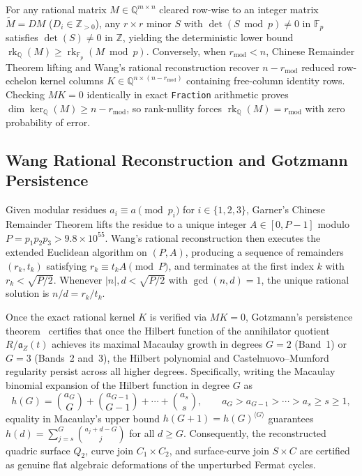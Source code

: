 \documentclass[11pt,a4paper]{article}
\begin{document}
For any rational matrix $M \in \mathbb{Q}^{m \times n}$ cleared row-wise to an integer matrix $\widetilde{M} = D M$ ($D_i \in \mathbb{Z}_{>0}$), any $r \times r$ minor $S$ with $\det(S \bmod p) \neq 0$ in $\mathbb{F}_p$ satisfies $\det(S) \neq 0$ in $\mathbb{Z}$, yielding the deterministic lower bound $\operatorname{rk}_{\mathbb{Q}}(M) \ge \operatorname{rk}_{\mathbb{F}_p}(M \bmod p)$. Conversely, when $r_{\mathrm{mod}} < n$, Chinese Remainder Theorem lifting and Wang's rational reconstruction recover $n - r_{\mathrm{mod}}$ reduced row-echelon kernel columns $K \in \mathbb{Q}^{n \times (n - r_{\mathrm{mod}})}$ containing free-column identity rows. Checking $M K = 0$ identically in exact \texttt{Fraction} arithmetic proves $\dim \ker_{\mathbb{Q}}(M) \ge n - r_{\mathrm{mod}}$, so rank-nullity forces $\operatorname{rk}_{\mathbb{Q}}(M) = r_{\mathrm{mod}}$ with zero probability of error.

\subsection{Wang Rational Reconstruction and Gotzmann Persistence}
Given modular residues $a_i \equiv a \pmod{p_i}$ for $i \in \{1, 2, 3\}$, Garner's Chinese Remainder Theorem lifts the residue to a unique integer $A \in [0, P - 1]$ modulo $P = p_1 p_2 p_3 > 9.8 \times 10^{55}$. Wang's rational reconstruction then executes the extended Euclidean algorithm on $(P, A)$, producing a sequence of remainders $(r_k, t_k)$ satisfying $r_k \equiv t_k A \pmod{P}$, and terminates at the first index $k$ with $r_k < \sqrt{P/2}$. Whenever $|n|, d < \sqrt{P/2}$ with $\gcd(n, d) = 1$, the unique rational solution is $n/d = r_k / t_k$.

Once the exact rational kernel $K$ is verified via $M K = 0$, Gotzmann's persistence theorem~\cite{Gotzmann1978,Green1989} certifies that once the Hilbert function of the annihilator quotient $R / \mathfrak{a}_Z(t)$ achieves its maximal Macaulay growth in degrees $G = 2$ (Band~1) or $G = 3$ (Bands~2 and~3), the Hilbert polynomial and Castelnuovo--Mumford regularity persist across all higher degrees. Specifically, writing the Macaulay binomial expansion of the Hilbert function in degree $G$ as
\begin{equation}
  h(G) = \binom{a_G}{G} + \binom{a_{G-1}}{G-1} + \cdots + \binom{a_s}{s}, \qquad a_G > a_{G-1} > \cdots > a_s \ge s \ge 1,
\end{equation}
equality in Macaulay's upper bound $h(G+1) = h(G)^{\langle G \rangle}$ guarantees $h(d) = \sum_{j=s}^G \binom{a_j + d - G}{j}$ for all $d \ge G$. Consequently, the reconstructed quadric surface $Q_2$, curve join $C_1 \times C_2$, and surface-curve join $S \times C$ are certified as genuine flat algebraic deformations of the unperturbed Fermat cycles.
\end{document}
